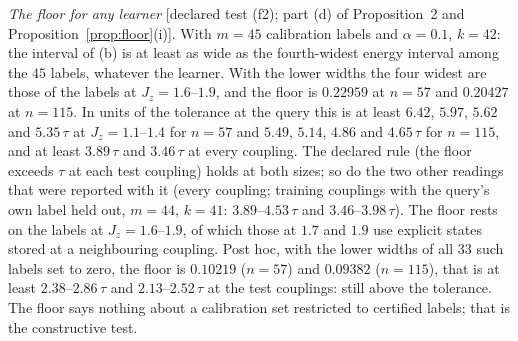 \documentclass[aps,prx,onecolumn,10pt,nofootinbib,longbibliography,floatfix]{revtex4-2}
\theoremstyle{remark}
\newcommand{\Jz}{J_z}
\begin{document}
\emph{The floor for any learner} [declared test (f2); part (d) of Proposition~2 and Proposition~\ref{prop:floor}(i)]. %
With $m=45$ calibration labels and $\alpha=0.1$, $k=42$: the interval of (b) is at least as wide as the %
fourth-widest energy interval among the $45$ labels, whatever the learner. With the lower widths the four widest
are those of the labels at $\Jz=1.6$--$1.9$, and the floor is $0.22959$ at $n=57$ and $0.20427$ at $n=115$. In %
units of the tolerance at the query this is at least $6.42$, $5.97$, $5.62$ and $5.35\,\tau$ at %
$\Jz=1.1$--$1.4$ for $n=57$ and $5.49$, $5.14$, $4.86$ and $4.65\,\tau$ for $n=115$, and at least $3.89\,\tau$ %
and $3.46\,\tau$ at every coupling. The declared rule (the floor exceeds $\tau$ at each test coupling) holds at %
both sizes; so do the two other readings that were reported with it (every coupling; training couplings with the
query's own label held out, $m=44$, $k=41$: $3.89$--$4.53\,\tau$ and $3.46$--$3.98\,\tau$). The floor rests on %
the labels at $\Jz=1.6$--$1.9$, of which those at $1.7$ and $1.9$ use explicit states stored at a neighbouring %
coupling. Post hoc, with the lower widths of all $33$ such labels set to zero, the floor is $0.10219$ ($n=57$) and %
$0.09382$ ($n=115$), that is at least $2.38$--$2.86\,\tau$ and $2.13$--$2.52\,\tau$ at the test couplings: still %
above the tolerance. The floor says nothing about a calibration set restricted to certified labels; that is the
constructive test.
\end{document}
